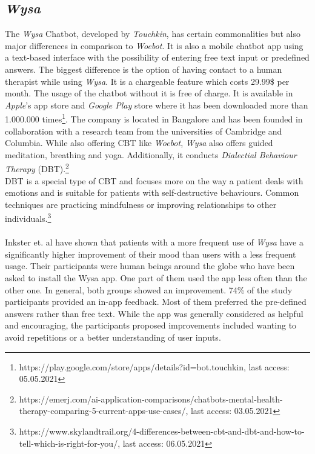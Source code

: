 \documentclass[sigconf, nonacm]{acmart}
\begin{document}
\subsection{\emph{Wysa}}
\label{sec:two_two}
The \emph{Wysa} Chatbot, developed by \emph{Touchkin}, has certain commonalities but also major differences in comparison to \emph{Woebot}. It is also a mobile chatbot app using a text-based interface with the possibility of entering 
free text input or predefined answers. The biggest difference is the option of having contact to 
a human therapist while using \emph{Wysa}. It is a chargeable feature which costs 29.99\$ per month. The usage of the chatbot without it is free of charge. It is available
in \emph{Apple}'s app store and \emph{Google Play} store where it has been downloaded more than 1.000.000 times\footnote{https://play.google.com/store/apps/details?id=bot.touchkin, last access: 05.05.2021}. 
The company is located in Bangalore and has been founded in collaboration with a research team from the universities of Cambridge and Columbia.
While also offering CBT like \emph{Woebot}, \emph{Wysa} also offers guided meditation, breathing and yoga. Additionally, it conducts \emph{Dialectial Behaviour Therapy} (DBT).\footnote{https://emerj.com/ai-application-comparisons/chatbots-mental-health-therapy-comparing-5-current-apps-use-cases/, last access: 03.05.2021}
\\
DBT is a special type of CBT and focuses more on the way a patient deals with emotions and is suitable for patients with self-destructive behaviours. Common techniques are practicing mindfulness or 
improving relationships to other individuals.\footnote{https://www.skylandtrail.org/4-differences-between-cbt-and-dbt-and-how-to-tell-which-is-right-for-you/, last access: 06.05.2021} 
\\\\
Inkster et. al \cite{Inkster} have shown that patients with a more frequent use of \emph{Wysa} have a significantly higher improvement of their mood than users
with a less frequent usage. Their participants were human beings around the globe who have been asked to install the Wysa app. One part of them used the app less often than the other one. In general, both groups showed an improvement. 74\% of the study participants provided an in-app feedback. Most of them preferred the pre-defined answers rather than free text.
While the app was generally considered as helpful and encouraging, the participants proposed improvements included wanting to avoid repetitions or a better understanding of user inputs.
\end{document}
